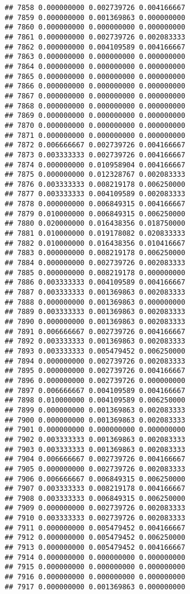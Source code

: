 \documentclass[
]{article}
\begin{document}
\begin{verbatim}
## 7858 0.000000000 0.002739726 0.004166667
## 7859 0.000000000 0.001369863 0.000000000
## 7860 0.000000000 0.000000000 0.000000000
## 7861 0.000000000 0.002739726 0.002083333
## 7862 0.000000000 0.004109589 0.004166667
## 7863 0.000000000 0.000000000 0.000000000
## 7864 0.000000000 0.000000000 0.000000000
## 7865 0.000000000 0.000000000 0.000000000
## 7866 0.000000000 0.000000000 0.000000000
## 7867 0.000000000 0.000000000 0.000000000
## 7868 0.000000000 0.000000000 0.000000000
## 7869 0.000000000 0.000000000 0.000000000
## 7870 0.000000000 0.000000000 0.000000000
## 7871 0.000000000 0.000000000 0.000000000
## 7872 0.006666667 0.002739726 0.004166667
## 7873 0.003333333 0.002739726 0.004166667
## 7874 0.000000000 0.010958904 0.004166667
## 7875 0.000000000 0.012328767 0.002083333
## 7876 0.003333333 0.008219178 0.006250000
## 7877 0.003333333 0.004109589 0.002083333
## 7878 0.000000000 0.006849315 0.004166667
## 7879 0.010000000 0.006849315 0.006250000
## 7880 0.020000000 0.016438356 0.018750000
## 7881 0.010000000 0.019178082 0.020833333
## 7882 0.010000000 0.016438356 0.010416667
## 7883 0.000000000 0.008219178 0.006250000
## 7884 0.000000000 0.002739726 0.002083333
## 7885 0.000000000 0.008219178 0.000000000
## 7886 0.003333333 0.004109589 0.004166667
## 7887 0.003333333 0.001369863 0.002083333
## 7888 0.000000000 0.001369863 0.000000000
## 7889 0.003333333 0.001369863 0.002083333
## 7890 0.000000000 0.001369863 0.002083333
## 7891 0.006666667 0.002739726 0.004166667
## 7892 0.003333333 0.001369863 0.002083333
## 7893 0.003333333 0.005479452 0.006250000
## 7894 0.000000000 0.002739726 0.002083333
## 7895 0.000000000 0.002739726 0.004166667
## 7896 0.000000000 0.002739726 0.000000000
## 7897 0.006666667 0.004109589 0.004166667
## 7898 0.010000000 0.004109589 0.006250000
## 7899 0.000000000 0.001369863 0.002083333
## 7900 0.000000000 0.001369863 0.002083333
## 7901 0.000000000 0.000000000 0.000000000
## 7902 0.003333333 0.001369863 0.002083333
## 7903 0.003333333 0.001369863 0.002083333
## 7904 0.006666667 0.002739726 0.004166667
## 7905 0.000000000 0.002739726 0.002083333
## 7906 0.006666667 0.006849315 0.006250000
## 7907 0.003333333 0.008219178 0.004166667
## 7908 0.003333333 0.006849315 0.006250000
## 7909 0.000000000 0.002739726 0.002083333
## 7910 0.003333333 0.002739726 0.002083333
## 7911 0.000000000 0.005479452 0.004166667
## 7912 0.000000000 0.005479452 0.006250000
## 7913 0.000000000 0.005479452 0.004166667
## 7914 0.000000000 0.000000000 0.000000000
## 7915 0.000000000 0.000000000 0.000000000
## 7916 0.000000000 0.000000000 0.000000000
## 7917 0.000000000 0.001369863 0.000000000

\end{verbatim}
\end{document}

